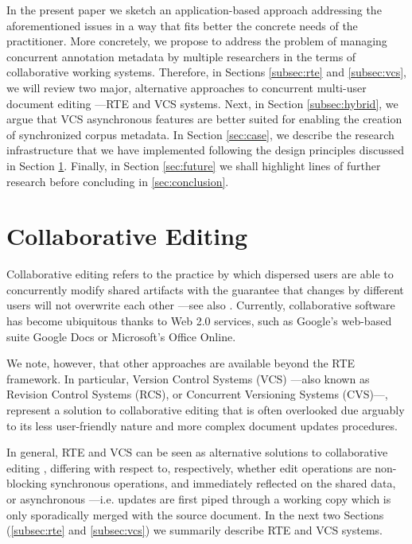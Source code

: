 \documentclass{sig-alternate}
\begin{document}
In the present paper we sketch an application-based approach addressing the aforementioned
issues in a way that fits better the concrete needs of the practitioner.
More concretely, we propose to address the problem of managing concurrent annotation
metadata by multiple researchers in the terms of collaborative working systems.
Therefore, in Sections \ref{subsec:rte} and \ref{subsec:vcs}, we will review two major,
alternative approaches to concurrent multi-user document editing ---RTE and VCS systems.
Next, in Section \ref{subsec:hybrid}, we argue that VCS asynchronous features are better suited
for enabling the creation of synchronized corpus metadata.
In Section \ref{sec:case}, we describe the research infrastructure that we have implemented
following the design principles discussed in Section \ref{sec:cde}.
Finally, in Section \ref{sec:future} we shall highlight lines of further research before
concluding in \ref{sec:conclusion}.

\section{Collaborative Editing}\label{sec:cde}
Collaborative editing refers to the practice by which dispersed
users are able to concurrently modify shared artifacts with the guarantee that changes
by different users will not overwrite each other ---see also \cite{Altmanninger2009}.
Currently, collaborative software has become ubiquitous thanks to Web 2.0 services, such as
Google's web-based suite Google Docs or Microsoft's Office Online.

We note, however, that other approaches are available beyond the RTE framework. In
particular, Version Control Systems (VCS) ---also known as Revision Control
Systems (RCS), or Concurrent Versioning Systems (CVS)---, represent a solution
to collaborative editing that is often overlooked due arguably to its less user-friendly
nature and more complex document updates procedures.

In general, RTE and VCS can be seen as alternative solutions to collaborative
editing \cite{Altmanninger2009}, differing with respect to, respectively, whether edit
operations are non-blocking synchronous operations, and immediately reflected on the shared
data, or asynchronous ---i.e. updates are first piped
through a working copy which is only sporadically merged with the source document.
In the next two Sections (\ref{subsec:rte} and \ref{subsec:vcs}) we summarily describe RTE
and VCS systems.
\end{document}
